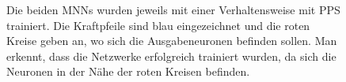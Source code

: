 \documentclass[10pt]{scrartcl}
\begin{document}
\begin{figure}[htb!]
  \centering
  \hfill
  \caption{Die beiden MNNs wurden jeweils mit einer Verhaltensweise mit PPS trainiert. Die Kraftpfeile sind blau eingezeichnet und die roten Kreise geben an, wo sich die Ausgabeneuronen befinden sollen. Man erkennt, dass die Netzwerke erfolgreich trainiert wurden, da sich die Neuronen in der Nähe der roten Kreisen befinden.}
  \label{fig:succes}
\end{figure}
\end{document}

